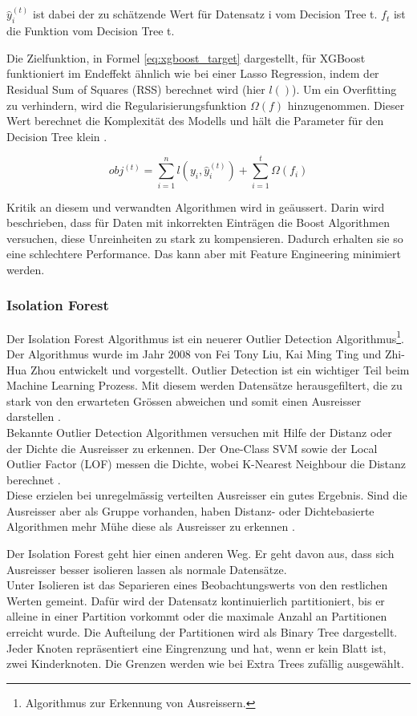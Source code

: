 $\hat{y}_{i}^{(t)}$ ist dabei der zu schätzende Wert für Datensatz i vom Decision Tree t. $f_t$ ist die Funktion vom Decision Tree t.

Die Zielfunktion, in Formel \eqref{eq:xgboost_target} dargestellt, für XGBoost funktioniert im Endeffekt ähnlich wie bei einer Lasso Regression, indem der Residual Sum of Squares (RSS) berechnet wird (hier $l()$).
Um ein Overfitting zu verhindern, wird die Regularisierungsfunktion $\Omega(f)$ hinzugenommen. Dieser Wert berechnet die Komplexität des Modells und hält die Parameter für den Decision Tree klein \cite{xgboost_1, xgboost_2}.

\begin{equation}
\label{eq:xgboost_target}
obj^{(t)} = \sum_{i=1}^{n} l(y_i, \hat{y}_{i}^{(t)}) + \sum_{i=1}^{t} \Omega(f_i)
\end{equation}

Kritik an diesem und verwandten Algorithmen wird in \cite{critic} geäussert. Darin wird beschrieben, dass für Daten mit inkorrekten Einträgen die Boost Algorithmen versuchen, diese Unreinheiten zu stark zu kompensieren. Dadurch erhalten sie so eine schlechtere Performance. Das kann aber mit Feature Engineering minimiert werden.
%
\subsubsection{Isolation Forest}
Der Isolation Forest Algorithmus ist ein neuerer Outlier Detection Algorithmus\footnote{Algorithmus zur Erkennung von Ausreissern.}. Der Algorithmus wurde im Jahr 2008 von Fei Tony Liu, Kai Ming Ting und Zhi-Hua Zhou entwickelt und vorgestellt. Outlier Detection ist ein wichtiger Teil beim Machine Learning Prozess. Mit diesem werden Datensätze herausgefiltert, die zu stark von den erwarteten Grössen abweichen und somit einen Ausreisser darstellen \cite{isolation_forest_1}.\\
Bekannte Outlier Detection Algorithmen versuchen mit Hilfe der Distanz oder der Dichte die Ausreisser zu erkennen. Der One-Class SVM sowie der Local Outlier Factor (LOF) messen die Dichte, wobei K-Nearest Neighbour die Distanz berechnet \cite{isolation_forest_2}.\\
Diese erzielen bei unregelmässig verteilten Ausreisser ein gutes Ergebnis. Sind die Ausreisser aber als Gruppe vorhanden, haben Distanz- oder Dichtebasierte Algorithmen mehr Mühe diese als Ausreisser zu erkennen \cite{isolation_forest_3}.

Der Isolation Forest geht hier einen anderen Weg. Er geht davon aus, dass sich Ausreisser besser isolieren lassen als normale Datensätze.\\
Unter Isolieren ist das Separieren eines Beobachtungswerts von den restlichen Werten gemeint. Dafür wird der Datensatz kontinuierlich partitioniert, bis er alleine in einer Partition vorkommt oder die maximale Anzahl an Partitionen erreicht wurde. Die Aufteilung der Partitionen wird als Binary Tree dargestellt. Jeder Knoten repräsentiert eine Eingrenzung und hat, wenn er kein Blatt ist, zwei Kinderknoten. Die Grenzen werden wie bei Extra Trees zufällig ausgewählt.

